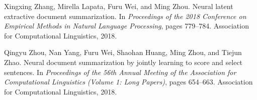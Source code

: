 \documentclass{article}
\begin{document}
\begin{thebibliography}{10}
Xingxing Zhang, Mirella Lapata, Furu Wei, and Ming Zhou.
\newblock Neural latent extractive document summarization.
\newblock In {\em Proceedings of the 2018 Conference on Empirical Methods in
  Natural Language Processing}, pages 779--784. Association for Computational
  Linguistics, 2018.

Qingyu Zhou, Nan Yang, Furu Wei, Shaohan Huang, Ming Zhou, and Tiejun Zhao.
\newblock Neural document summarization by jointly learning to score and select
  sentences.
\newblock In {\em Proceedings of the 56th Annual Meeting of the Association for
  Computational Linguistics (Volume 1: Long Papers)}, pages 654--663.
  Association for Computational Linguistics, 2018.

\end{thebibliography}
\end{document}
